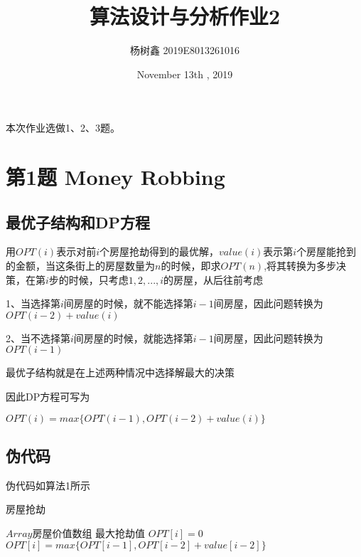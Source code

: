 \documentclass{article}
\title{算法设计与分析作业2}
\author{杨树鑫 2019E8013261016}
\date{November 13th , 2019}
\begin{document}
\maketitle

本次作业选做1、2、3题。
\section{第1题 Money Robbing}
\subsection{最优子结构和DP方程}
用$OPT(i)$表示对前$i$个房屋抢劫得到的最优解，$value(i)$表示第$i$个房屋能抢到的金额，当这条街上的房屋数量为$n$的时候，即求$OPT(n)$,将其转换为多步决策，在第$i$步的时候，只考虑${1,2,...,i}$的房屋，从后往前考虑
\par 1、当选择第$i$间房屋的时候，就不能选择第$i-1$间房屋，因此问题转换为$OPT(i-2)+value(i)$
\par 2、当不选择第$i$间房屋的时候，就能选择第$i-1$间房屋，因此问题转换为$OPT(i-1)$
\par 最优子结构就是在上述两种情况中选择解最大的决策
\par 因此DP方程可写为
\begin{center}
    $OPT(i) = max\{OPT(i-1), OPT(i-2)+value(i)\}$
\end{center}

\subsection{伪代码}
\par 伪代码如算法1所示

\begin{CJK*}{UTF8}{gkai}
    \begin{algorithm}
        \caption{房屋抢劫}
        \begin{algorithmic}[1] %
            \Require $Array$房屋价值数组
            \Ensure 最大抢劫值
                    \State $OPT[i] = 0$
                \EndFor
                    \State $OPT[i] = max\{OPT[i-1], OPT[i-2]+value[i-2]\}$
                \EndFor
                \State {}
            \EndFunction
        \end{algorithmic}
    \end{algorithm}
\end{CJK*}
\end{document}
